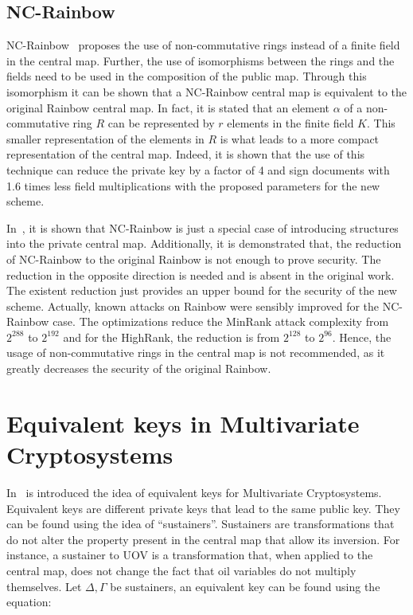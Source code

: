 \documentclass{ufsctex/ufsctex}
\begin{document}
\subsection{NC-Rainbow}

NC-Rainbow~\cite{yasuda2012reducing} proposes the use of non-commutative rings
instead of a finite field in the central map. Further, the use of isomorphisms
between the rings and the fields need to be used in the composition of the
public map. Through this isomorphism it can be shown that a NC-Rainbow central
map is equivalent to the original Rainbow central map. In fact, it is stated
that an element $\alpha$ of a non-commutative ring $R$ can be represented by
$r$ elements in the finite field $K$. This smaller representation of the
elements in $R$ is what leads to a more compact representation of the central
map. Indeed, it is shown that the use of this technique can reduce the private
key by a factor of 4 and sign documents with 1.6 times less field
multiplications with the proposed parameters for the new scheme.

In~\cite{thomae2012quo}, it is shown that NC-Rainbow is just a special case of
introducing structures into the private central map. Additionally, it is
demonstrated that, the reduction of NC-Rainbow to the original Rainbow is not
enough to prove security. The reduction in the opposite direction is needed and
is absent in the original work. The existent reduction just provides an upper
bound for the security of the new scheme. Actually, known attacks on Rainbow
were sensibly improved for the NC-Rainbow case. The optimizations reduce the
MinRank attack complexity from $2^{288}$ to $2^{192}$ and for the HighRank, the
reduction is from $2^{128}$ to $2^{96}$. Hence, the usage of non-commutative
rings in the central map is not recommended, as it greatly decreases the
security of the original Rainbow.

\section{Equivalent keys in Multivariate Cryptosystems}
\label{sec:equivalentkeys}

In~\cite{wolf2005equivalent} is introduced the idea of equivalent keys for
Multivariate Cryptosystems. Equivalent keys are different private keys that
lead to the same public key. They can be found using the idea of
``sustainers''.  Sustainers are transformations that do not alter the property
present in the central map that allow its inversion. For instance, a sustainer
to UOV is a transformation that, when applied to the central map, does not
change the fact that oil variables do not multiply themselves. Let $\Delta,
\Gamma$ be sustainers, an equivalent key can be found using the equation:
\end{document}
